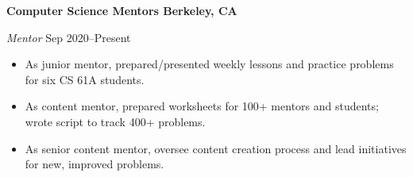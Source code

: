 \textbf{Computer Science Mentors \hfill Berkeley, CA} \par
\textit{ Mentor} \hfill Sep 2020--Present \par
\begin{itemize}
	\item As junior mentor, prepared/presented weekly lessons and practice problems for six CS 61A students.
	\item As content mentor, prepared worksheets for 100+ mentors and students; wrote script to track 400+ problems.
	\item As senior content mentor, oversee content creation process and lead initiatives for new, improved problems.
\end{itemize}\par